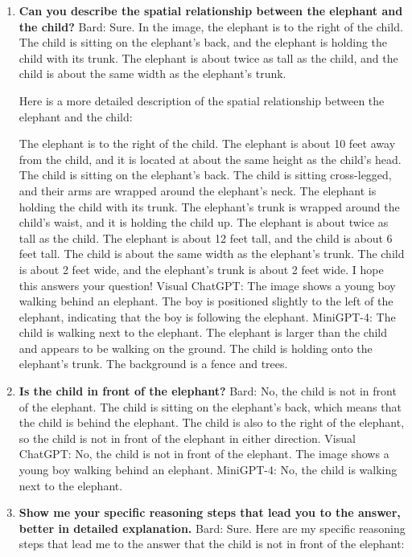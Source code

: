     \begin{enumerate}
        \item \textbf{Can you describe the spatial relationship between the elephant and the child?}
        \subitem Bard:
        Sure. In the image, the elephant is to the right of the child. The child is sitting on the elephant's back, and the elephant is holding the child with its trunk. The elephant is about twice as tall as the child, and the child is about the same width as the elephant's trunk.
        
        Here is a more detailed description of the spatial relationship between the elephant and the child:
        
        The elephant is to the right of the child. The elephant is about 10 feet away from the child, and it is located at about the same height as the child's head.
        The child is sitting on the elephant's back. The child is sitting cross-legged, and their arms are wrapped around the elephant's neck.
        The elephant is holding the child with its trunk. The elephant's trunk is wrapped around the child's waist, and it is holding the child up.
        The elephant is about twice as tall as the child. The elephant is about 12 feet tall, and the child is about 6 feet tall.
        The child is about the same width as the elephant's trunk. The child is about 2 feet wide, and the elephant's trunk is about 2 feet wide.
        I hope this answers your question!
        \subitem Visual ChatGPT: The image shows a young boy walking behind an elephant. The boy is positioned slightly to the left of the elephant, indicating that the boy is following the elephant.
        \subitem MiniGPT-4: The child is walking next to the elephant. The elephant is larger than the child and appears to be walking on the ground. The child is holding onto the elephant’s trunk. The background is a fence and trees.
        \item \textbf{Is the child in front of the elephant?}
        \subitem Bard: 
        No, the child is not in front of the elephant. The child is sitting on the elephant's back, which means that the child is behind the elephant. The child is also to the right of the elephant, so the child is not in front of the elephant in either direction.
        \subitem Visual ChatGPT: No, the child is not in front of the elephant. The image shows a young boy walking behind an elephant.
        \subitem MiniGPT-4: No, the child is walking next to the elephant.
        \item \textbf{Show me your specific reasoning steps that lead you to the answer, better in detailed explanation.}
        \subitem Bard:
        Sure. Here are my specific reasoning steps that lead me to the answer that the child is not in front of the elephant:


\end{enumerate}
